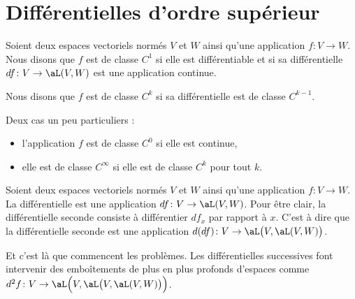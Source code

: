 \section{Différentielles d'ordre supérieur}		\label{SecDiffOrdSup}

\begin{definition}  \label{DefPNjMGqy}
    Soient deux espaces vectoriels normés \( V\) et \( W\) ainsi qu'une application \( f\colon V\to W\). Nous disons que \( f\) est de classe \( C^1\) si elle est différentiable et si sa différentielle \( df\colon V\to \aL(V,W)\) est une application continue.

    Nous disons que \( f\) est de classe \( C^k\) si sa différentielle est de classe \( C^{k-1}\).

    Deux cas un peu particuliers :
    \begin{itemize}
        \item l'application \( f\) est de classe \( C^0\) si elle est continue,
        \item elle est de classe \( C^{\infty}\) si elle est de classe \( C^k\) pour tout \( k\).
    \end{itemize}
\end{definition}

Soient deux espaces vectoriels normés \( V\) et \( W\) ainsi qu'une application \( f\colon V\to W\). La différentielle est une application \( df\colon V\to \aL(V,W)\). Pour être clair, la différentielle seconde consiste à différentier \( df_x\) par rapport à \( x\). C'est à dire que la différentielle seconde est une application \( d(df)\colon V\to \aL\big( V,\aL(V,W) \big)\).

Et c'est là que commencent les problèmes. Les différentielles successives font intervenir des emboîtements de plus en plus profonds d'espaces comme \( d^2f\colon V\to \aL\Big( V,\aL\big( V,\aL(V,W) \big) \Big)\).


